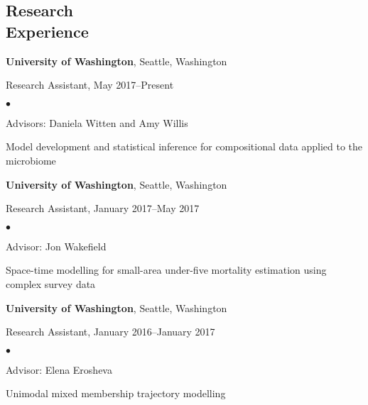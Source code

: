 \documentclass[margin,centered]{res}
\newenvironment{list1}{
  \begin{list}{\ding{113}}{%
      \setlength{\itemsep}{0in}
      \setlength{\parsep}{0in} \setlength{\parskip}{0in}
      \setlength{\topsep}{0in} \setlength{\partopsep}{0in}
      \setlength{\leftmargin}{0.17in}}}{\end{list}}
\newenvironment{list2}{
  \begin{list}{$\bullet$}{%
      \setlength{\itemsep}{0in}
      \setlength{\parsep}{0in} \setlength{\parskip}{0in}
      \setlength{\topsep}{0in} \setlength{\partopsep}{0in}
      \setlength{\leftmargin}{0.2in}}}{\end{list}}
\begin{document}
\begin{resume}
\section{\sc Research\\ Experience}
{\bf University of Washington},  Seattle, Washington
\begin{list1}
\item[] 
Research Assistant, May 2017--Present
\begin{list2}
\vspace*{.05in}
\item Advisors: Daniela Witten and Amy Willis
\item Model development and statistical inference for compositional data applied to the microbiome
\end{list2} 
\end{list1}


{\bf University of Washington},  Seattle, Washington
\begin{list1}
\item[] 
Research Assistant, January 2017--May 2017
\begin{list2}
\vspace*{.05in}
\item Advisor: Jon Wakefield
\item Space-time modelling for  small-area under-five mortality estimation using complex survey data
\end{list2} 
\end{list1}

{\bf University of Washington},  Seattle, Washington
\begin{list1}
\item[] 
Research Assistant, January 2016--January 2017
\begin{list2}
\vspace*{.05in}
\item Advisor: Elena Erosheva
\item Unimodal mixed membership trajectory modelling
\end{list2} 
\end{list1}





\end{resume}
\end{document}
